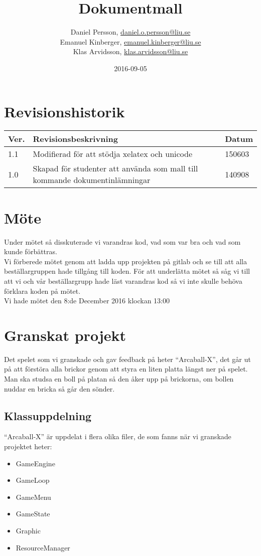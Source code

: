 \documentclass{TDP003mall}
\author{Daniel Persson, \url{daniel.o.persson@liu.se}\\
  Emanuel Kinberger, \url{emanuel.kinberger@liu.se}\\
  Klas Arvidsson, \url{klas.arvidsson@liu.se}}
\title{Dokumentmall}
\date{2016-09-05}
\begin{document}
\projectpage
\section{Revisionshistorik}
\begin{table}[!h]
\begin{tabularx}{\linewidth}{|l|X|l|}
\hline
Ver. & Revisionsbeskrivning & Datum \\\hline
1.1 & Modifierad för att stödja xelatex och unicode & 150603 \\\hline
1.0 & Skapad för studenter att använda som mall till
kommande dokumentinlämningar & 140908 \\\hline
\end{tabularx}
\end{table}


\section{Möte}
Under mötet så disskuterade vi varandras kod, vad som var bra och vad som kunde förbättras. \\
Vi förberede mötet genom att ladda upp projekten på gitlab och se till att alla beställargruppen hade tillgång till koden. För att underlätta mötet så såg vi till att vi och vår beställargrupp hade läst varandras kod så vi inte skulle behöva förklara koden på mötet. \\
Vi hade mötet den 8:de December 2016 klockan 13:00

\section{Granskat projekt}
Det spelet som vi granskade och gav feedback på heter ``Arcaball-X'', det går ut på att förstöra alla brickor genom att styra en liten platta längst ner på spelet. Man ska studsa en boll på platan så den åker upp på brickorna, om bollen nuddar en bricka så går den sönder.

\subsection{Klassuppdelning}
``Arcaball-X'' är uppdelat i flera olika filer, de som fanns när vi granskade projektet heter:
\begin{itemize}
\item GameEngine
\item GameLoop
\item GameMenu
\item GameState
\item Graphic
\item ResourceManager
\end{itemize}
\end{document}
